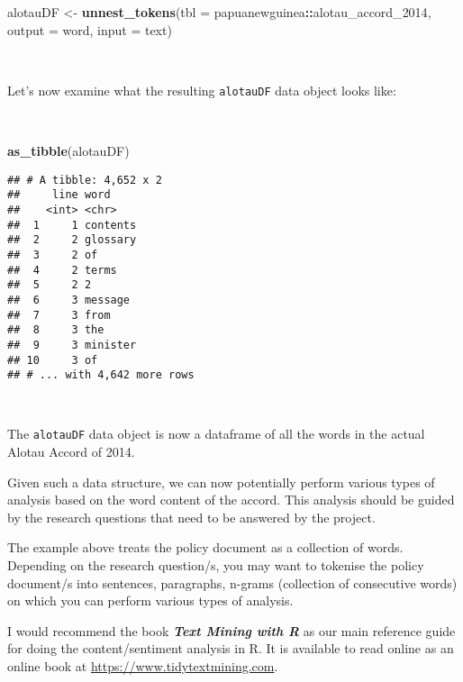 \documentclass[11pt,a4paper]{article}
\newenvironment{Shaded}{\begin{snugshade}}{\end{snugshade}}
\newcommand{\KeywordTok}[1]{\textcolor[rgb]{0.13,0.29,0.53}{\textbf{#1}}}
\newcommand{\DataTypeTok}[1]{\textcolor[rgb]{0.13,0.29,0.53}{#1}}
\newcommand{\DecValTok}[1]{\textcolor[rgb]{0.00,0.00,0.81}{#1}}
\newcommand{\StringTok}[1]{\textcolor[rgb]{0.31,0.60,0.02}{#1}}
\newcommand{\OperatorTok}[1]{\textcolor[rgb]{0.81,0.36,0.00}{\textbf{#1}}}
\newcommand{\NormalTok}[1]{#1}
\begin{document}
\begin{Shaded}
\begin{Highlighting}[]
\NormalTok{alotauDF <-}\StringTok{ }\KeywordTok{unnest_tokens}\NormalTok{(}\DataTypeTok{tbl =}\NormalTok{ papuanewguinea}\OperatorTok{::}\NormalTok{alotau_accord_}\DecValTok{2014}\NormalTok{,}
                          \DataTypeTok{output =}\NormalTok{ word, }
                          \DataTypeTok{input =}\NormalTok{ text)}
\end{Highlighting}
\end{Shaded}

~

Let's now examine what the resulting \texttt{alotauDF} data object looks
like:

~

\begin{Shaded}
\begin{Highlighting}[]
\KeywordTok{as_tibble}\NormalTok{(alotauDF)}
\end{Highlighting}
\end{Shaded}

\begin{verbatim}
## # A tibble: 4,652 x 2
##     line word    
##    <int> <chr>   
##  1     1 contents
##  2     2 glossary
##  3     2 of      
##  4     2 terms   
##  5     2 2       
##  6     3 message 
##  7     3 from    
##  8     3 the     
##  9     3 minister
## 10     3 of      
## # ... with 4,642 more rows
\end{verbatim}

~

The \texttt{alotauDF} data object is now a dataframe of all the words in
the actual Alotau Accord of 2014.

Given such a data structure, we can now potentially perform various
types of analysis based on the word content of the accord. This analysis
should be guided by the research questions that need to be answered by
the project.

The example above treats the policy document as a collection of words.
Depending on the research question/s, you may want to tokenise the
policy document/s into sentences, paragraphs, n-grams (collection of
consecutive words) on which you can perform various types of analysis.

I would recommend the book \textbf{\emph{Text Mining with R}} as our
main reference guide for doing the content/sentiment analysis in R. It
is available to read online as an online book at
\url{https://www.tidytextmining.com}.
\end{document}
